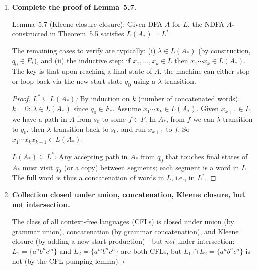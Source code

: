 \begin{enumerate}[{5.}1. ]
\textbf{Example.}  Let $A$ have $\Sigma=\{\pmb{a}\}$, $S=\{s_0,s_1\}$, $S_0=\{s_0\}$, $F=\{s_1\}$,
$\delta(s_0,\pmb{a})=\{s_0,s_1\}$, $\delta(s_1,\pmb{a})=\{s_1\}$.
Then $L(A)=\{\pmb{a}\}^+=\{\pmb{a},\pmb{aa},\ldots\}$.
After complementing: $F^\sim=\{s_0\}$.
$\pmb{a}$: from $s_0$, reach $\{s_0,s_1\}$; $s_0\in F^\sim$, so $\pmb{a}\in L(A^\sim)$.
But $\pmb{a}\in L(A)$, so $\pmb{a}\notin\sim L(A)$.  Thus $\pmb{a}\in L(A^\sim)$ but $\pmb{a}\notin\sim L(A)$, so $L(A^\sim)\neq\sim L(A)$.

\item \textbf{Complete the proof of Lemma~5.7.}

Lemma~5.7 (Kleene closure closure): Given DFA $A$ for $L$, the NDFA $A_*$ constructed in Theorem~5.5 satisfies $L(A_*)=L^*$.

The remaining cases to verify are typically: (i) $\lambda\in L(A_*)$ (by construction, $q_0\in F_*$), and (ii) the inductive step: if $x_1,\ldots,x_k\in L$ then $x_1\cdots x_k\in L(A_*)$.  The key is that upon reaching a final state of $A$, the machine can either stop or loop back via the new start state $q_0$ using a $\lambda$-transition.

\begin{proof}
\emph{$L^*\subseteq L(A_*)$:}  By induction on $k$ (number of concatenated words).  $k=0$: $\lambda\in L(A_*)$ since $q_0\in F_*$.  Assume $x_1\cdots x_k\in L(A_*)$.  Given $x_{k+1}\in L$, we have a path in $A$ from $s_0$ to some $f\in F$.  In $A_*$, from $f$ we can $\lambda$-transition to $q_0$, then $\lambda$-transition back to $s_0$, and run $x_{k+1}$ to $f$.  So $x_1\cdots x_kx_{k+1}\in L(A_*)$.

\emph{$L(A_*)\subseteq L^*$:}  Any accepting path in $A_*$ from $q_0$ that touches final states of $A_*$ must visit $q_0$ (or a copy) between segments; each segment is a word in $L$.  The full word is thus a concatenation of words in $L$, i.e., in $L^*$.
\end{proof}

\item \textbf{Collection closed under union, concatenation, Kleene closure, but not intersection.}

The class of all context-free languages (CFLs) is closed under union (by grammar union), concatenation (by grammar concatenation), and Kleene closure (by adding a new start production)---but \emph{not} under intersection: $L_1=\{a^nb^nc^m\}$ and $L_2=\{a^mb^nc^n\}$ are both CFLs, but $L_1\cap L_2=\{a^nb^nc^n\}$ is not (by the CFL pumping lemma). $\square$


\end{enumerate}
